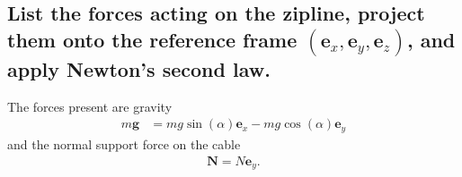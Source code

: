 \documentclass[11pt,a4paper]{exam}
\newcommand{\exACDH}{\bm e_x}
\newcommand{\eyACDH}{\bm e_y}
\newcommand{\ezACDH}{\bm e_z}
\begin{document}
\begin{parts}
\part{List the forces acting on the zipline, project them onto the reference frame $(\exACDH, \eyACDH, \ezACDH)$, and apply Newton's second law.}
    \par\vspace{2mm}
    The forces present are gravity
    \begin{align}
        m\bm g &= mg\sin(\alpha) \exACDH - mg\cos(\alpha) \eyACDH
    \end{align}
    and the normal support force on the cable
    \begin{align}
        \bm N  = N \bm e_y.
    \end{align}
    

\end{parts}
\end{document}

